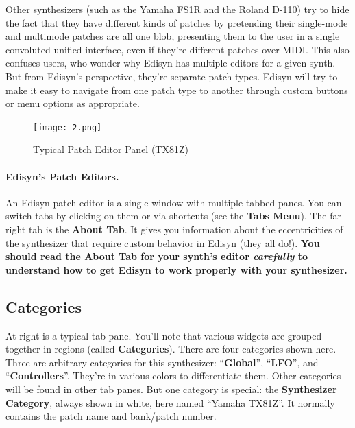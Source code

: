 \documentclass{article}
\begin{document}
Other synthesizers (such as the Yamaha FS1R and the Roland D-110) try to hide the fact that they have different kinds of patches by pretending their single-mode and multimode patches are all one blob, presenting them to the user in a single convoluted unified interface, even if they're different patches over MIDI. This also confuses users, who wonder why Edisyn has multiple editors for a given synth.  But from Edisyn's perspective, they're separate patch types.  Edisyn will try to make it easy to navigate from one patch type to another through custom buttons or menu options as appropriate.

\begin{figure}
\vspace{-1em}\texttt{[image: 2.png]}
\vspace{-3em}\caption{Typical Patch Editor Panel (TX81Z)}\label{typicalpatcheditorpanel}
\vspace{-2em}
\end{figure}

\paragraph{Edisyn's Patch Editors.}  An Edisyn patch editor is a single window with multiple tabbed panes.  You can switch tabs by clicking on them or via shortcuts (see the {\bf Tabs Menu}).  The far-right tab is the {\bf About Tab}.  It gives you information about the eccentricities of the synthesizer that require custom behavior in Edisyn (they all do!).  {\bf \color{red} You should read the About Tab for your synth's editor \textit{carefully} to understand how to get Edisyn to work properly with your synthesizer.}


\subsection{Categories}
At right is a typical tab pane.  You'll note that various widgets are grouped together in regions (called {\bf Categories}).  There are four categories shown here.  Three are arbitrary categories for this synthesizer: ``{\bf {\color{limegreen}Global}}'', ``{\bf {\color{hanpurple}LFO}}'', and ``{\bf {\color{goldenrod}Controllers}}''.  They're in various colors to differentiate them.  Other categories will be found in other tab panes.  But one category is special: the {\bf Synthesizer Category}, always shown in white, here named ``Yamaha TX81Z''.  It normally contains the patch name and bank/patch number.
\end{document}
